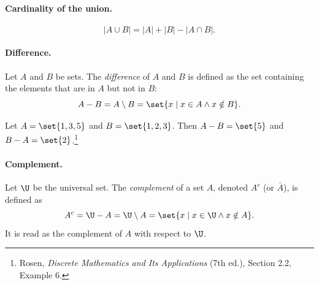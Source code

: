 \paragraph{Cardinality of the union.}
\[
|A \cup B| = |A| + |B| - |A \cap B|.
\]

\paragraph{Difference.}
Let $A$ and $B$ be sets. The \emph{difference} of $A$ and $B$ is defined as the set containing the elements that are in $A$ but not in $B$:
\[
A - B = A \setminus B = \set{x \mid x \in A \wedge x \notin B}.
\]

\begin{center}
\end{center}

\begin{example}
Let $A = \set{1,3,5}$ and $B = \set{1,2,3}$. Then $A - B = \set{5}$ and $B - A = \set{2}$.\footnote{Rosen, \emph{Discrete Mathematics and Its Applications} (7th ed.), Section 2.2, Example 6.}
\end{example}

\paragraph{Complement.}
Let $\U$ be the universal set. The \emph{complement} of a set $A$, denoted $A^c$ (or $\bar{A}$), is defined as
\[
A^c = \U - A = \U \setminus A = \set{x \mid x \in \U \wedge x \notin A}.
\]
It is read as the complement of $A$ with respect to $\U$.

\begin{center}
\end{center}

